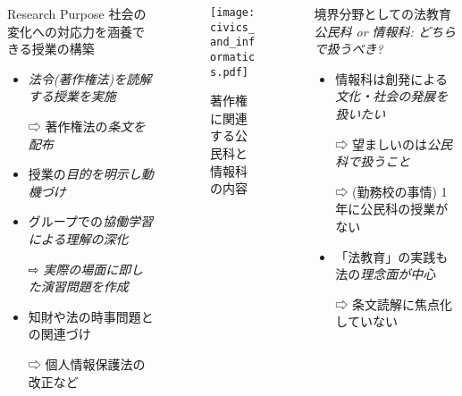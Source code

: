 \begin{columns}[onlytextwidth,t]
\begin{column}{.35\hsize}
\begin{alertblock}{Research Purpose}
\alert{社会の変化}への対応力を涵養できる授業の構築
\begin{itemize}
	\item \em{法令}(\alert{著作権法})を読解する授業を実施
	\item[⇨] 著作権法の\em{条文}を配布
	\item 授業の\em{目的を明示}し動機づけ
	\item グループでの\em{協働学習}による理解の深化
	\item[⇨] \em{実際の場面}に即した\em{演習}問題を作成
	\item 知財や法の時事問題との関連づけ
	\item[⇨] 個人情報保護法の改正など
\end{itemize}
\end{alertblock}
\end{column}
\begin{column}{.35\hsize}
\begin{figure}[hbtp]{\centering
\texttt{[image: civics\_and\_informatics.pdf]}
\caption{著作権に関連する公民科と情報科の内容}
}\end{figure}
\end{column}
\begin{column}{.27\hsize}
\begin{block}{境界分野としての法教育}
\em{公民}科 or \alert{情報}科: どちらで扱うべき?
\begin{itemize}
	\item \alert{情報}科は\alert{創発}による\em{文化・社会の発展}を扱いたい
	\item[⇨] 望ましいのは\em{公民}科で扱うこと
	\item[⇨] (勤務校の事情) 1年に公民科の授業がない
	\item 「法教育」の実践も法の\em{理念面}が中心
	\item[⇨] 条文読解に焦点化していない
\end{itemize}
\end{block}
\end{column}
\end{columns}


